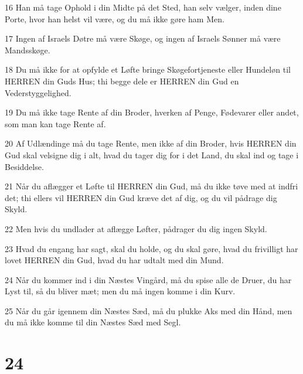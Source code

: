 \par 16 Han må tage Ophold i din Midte på det Sted, han selv vælger, inden dine Porte, hvor han helst vil være, og du må ikke gøre ham Men.
\par 17 Ingen af Israels Døtre må være Skøge, og ingen af Israels Sønner må være Mandsskøge.
\par 18 Du må ikke for at opfylde et Løfte bringe Skøgefortjeneste eller Hundeløn til HERREN din Guds Hus; thi begge dele er HERREN din Gud en Vederstyggelighed.
\par 19 Du må ikke tage Rente af din Broder, hverken af Penge, Fødevarer eller andet, som man kan tage Rente af.
\par 20 Af Udlændinge må du tage Rente, men ikke af din Broder, hvis HERREN din Gud skal velsigne dig i alt, hvad du tager dig for i det Land, du skal ind og tage i Besiddelse.
\par 21 Når du aflægger et Løfte til HERREN din Gud, må du ikke tøve med at indfri det; thi ellers vil HERREN din Gud kræve det af dig, og du vil pådrage dig Skyld.
\par 22 Men hvis du undlader at aflægge Løfter, pådrager du dig ingen Skyld.
\par 23 Hvad du engang har sagt, skal du holde, og du skal gøre, hvad du frivilligt har lovet HERREN din Gud, hvad du har udtalt med din Mund.
\par 24 Når du kommer ind i din Næstes Vingård, må du spise alle de Druer, du har Lyst til, så du bliver mæt; men du må ingen komme i din Kurv.
\par 25 Når du går igennem din Næstes Sæd, må du plukke Aks med din Hånd, men du må ikke komme til din Næstes Sæd med Segl.

\chapter{24}

